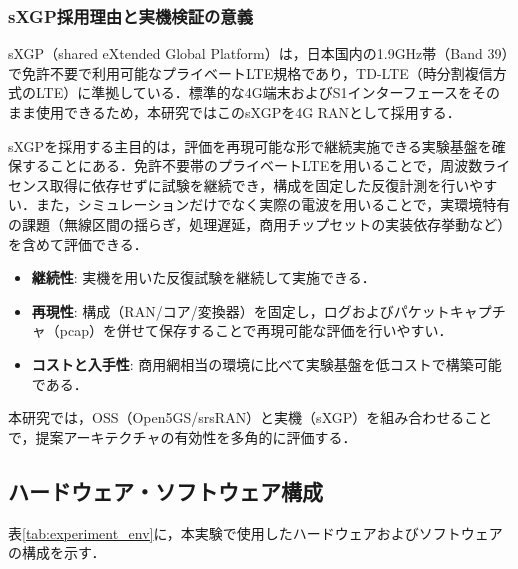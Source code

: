 \subsubsection{sXGP採用理由と実機検証の意義}
\label{subsubsec:sxgp}
sXGP（shared eXtended Global Platform）\cite{ARIB_STD_T118}は，日本国内の1.9GHz帯（Band 39）で免許不要で利用可能なプライベートLTE規格であり，TD-LTE（時分割複信方式のLTE）に準拠している．標準的な4G端末およびS1インターフェースをそのまま使用できるため，本研究ではこのsXGPを4G RANとして採用する．

sXGPを採用する主目的は，評価を再現可能な形で継続実施できる実験基盤を確保することにある．免許不要帯のプライベートLTEを用いることで，周波数ライセンス取得に依存せずに試験を継続でき，構成を固定した反復計測を行いやすい．また，シミュレーションだけでなく実際の電波を用いることで，実環境特有の課題（無線区間の揺らぎ，処理遅延，商用チップセットの実装依存挙動など）を含めて評価できる．
\begin{itemize}
    \item \textbf{継続性}: 実機を用いた反復試験を継続して実施できる．
    \item \textbf{再現性}: 構成（RAN/コア/変換器）を固定し，ログおよびパケットキャプチャ（pcap）を併せて保存することで再現可能な評価を行いやすい．
    \item \textbf{コストと入手性}: 商用網相当の環境に比べて実験基盤を低コストで構築可能である．
\end{itemize}
本研究では，OSS（Open5GS/srsRAN）と実機（sXGP）を組み合わせることで，提案アーキテクチャの有効性を多角的に評価する．

\subsection{ハードウェア・ソフトウェア構成}
表\ref{tab:experiment_env}に，本実験で使用したハードウェアおよびソフトウェアの構成を示す．


